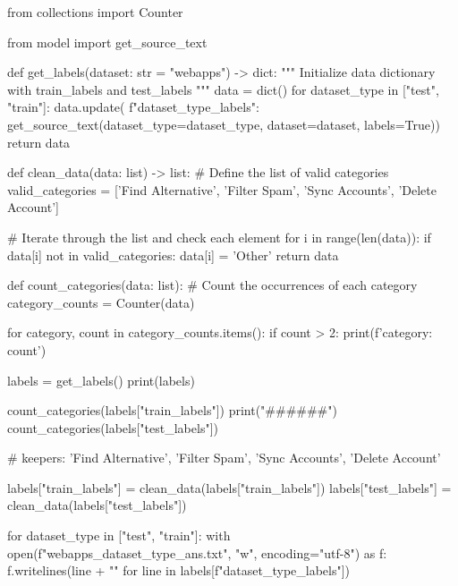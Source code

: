 \begin{python}
from collections import Counter

from model import get_source_text


def get_labels(dataset: str = "webapps") -> dict:
    """ Initialize data dictionary with train_labels and test_labels
    """
    data = dict()
    for dataset_type in ["test", "train"]:
        data.update(
            {f"{dataset_type}_labels": get_source_text(dataset_type=dataset_type, dataset=dataset, labels=True)})
    return data


def clean_data(data: list) -> list:
    # Define the list of valid categories
    valid_categories = ['Find Alternative', 'Filter Spam', 'Sync Accounts', 'Delete Account']

    # Iterate through the list and check each element
    for i in range(len(data)):
        if data[i] not in valid_categories:
            data[i] = 'Other'
    return data


def count_categories(data: list):
    # Count the occurrences of each category
    category_counts = Counter(data)

    for category, count in category_counts.items():
        if count > 2:
            print(f'{category}: {count}')


labels = get_labels()
print(labels)

count_categories(labels["train_labels"])
print("######")
count_categories(labels["test_labels"])

# keepers: 'Find Alternative', 'Filter Spam', 'Sync Accounts', 'Delete Account'

labels["train_labels"] = clean_data(labels["train_labels"])
labels["test_labels"] = clean_data(labels["test_labels"])

for dataset_type in ["test", "train"]:
    with open(f"webapps_{dataset_type}_ans.txt", "w", encoding="utf-8") as f:
        f.writelines(line + "\n" for line in labels[f"{dataset_type}_labels"])
\end{python}